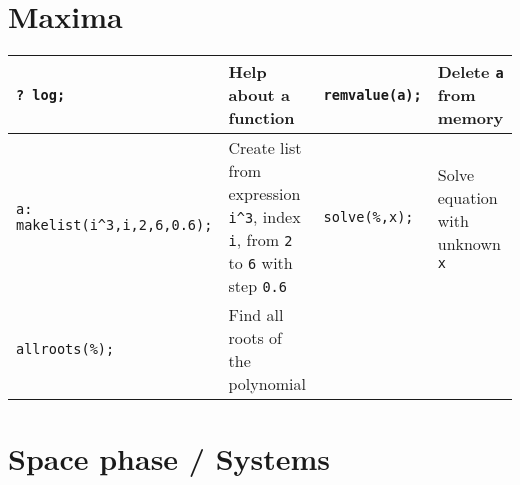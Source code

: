 \documentclass{form}
\begin{document}
\section*{Maxima}
\begin{center} \begin{tabular}{l p{52mm} | l p{52mm}}
    \texttt{? log;} & Help about a function & \texttt{remvalue(a);} & Delete \texttt{a} from memory \\ \hline
    \texttt{a: makelist(i\^{}3,i,2,6,0.6);} & Create list from expression \texttt{i\^{}3}, index \texttt{i}, from \texttt{2} to \texttt{6} with step \texttt{0.6} & \texttt{solve(\%,x);} & Solve equation with unknown \texttt{x} \\ \hline
    \texttt{allroots(\%);} & Find all roots of the polynomial & & 
\end{tabular} \end{center}
\newpage
\section*{Space phase / Systems}
\end{document}
